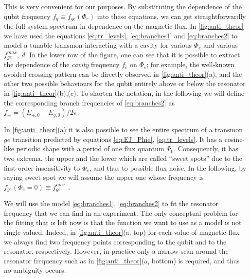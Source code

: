 \documentclass[%
 aip,
 draft,
 amsmath,amssymb,
 reprint,%
]{revtex4-1}
\begin{document}
This is very convenient for our purposes. By substituting the dependence of the qubit frequency $f_q \equiv f_{ge}(\Phi_e)$ into these equations, we can get straightforwardly the full system spectrum in dependence on the magnetic flux. In \autoref{fig:anti_theor} we have used the equations \eqref{eq:tr_levels}, \eqref{eq:branches1} and \eqref{eq:branches2} to model a tunable transmon interacting with a cavity for various $\Phi_e$ and various $f_{ge}^{max},\ d$. In the lower row of the figure, one can see that it is possible to extract the dependence of the \textit{cavity} frequency $f_c$ on $\Phi_e$; for example, the well-known avoided crossing pattern can be directly observed in \autoref{fig:anti_theor}(a), and the other two possible behaviours for the qubit entirely above or below the resonator in \autoref{fig:anti_theor}(b),(c). To shorten the notation, in the following we will define the corresponding branch frequencies of \eqref{eq:branches2} as $f_{\pm} = ( E_{\pm,0}-E_{g,0})/2\pi$.

In \autoref{fig:anti_theor}(a) it is also possible to see the entire spectrum of a transmon $ge$ transition predicted by equations \eqref{eq:EJ_Phie}, \eqref{eq:tr_levels}. It has a cosine-like periodic shape with a period of one flux quantum $\Phi_0$. Consequently, it has two extrema, the upper and the lower which are called ``sweet spots'' due to the first-order insensitivity to $\Phi_e$, and thus to possible flux noise. In the following, by saying sweet spot we will assume the upper one whose frequency is $f_{ge}(\Phi_e = 0) \equiv f^{max}_{ge}$ .

We will use the model \eqref{eq:branches1}, \eqref{eq:branches2} to fit the resonator frequency that we can find in an experiment. The only conceptual problem for the fitting that is left now is that the function we want to use as a model is not single-valued. Indeed, in \autoref{fig:anti_theor}(a, top) for each value of magnetic flux we always find two frequency points corresponding to the qubit and to the resonator, respectively. However, in practice only a narrow scan around the resonator frequency such as in \autoref{fig:anti_theor}(a, bottom) is required, and thus no ambiguity occurs. 

\listoffixmes
\end{document}
